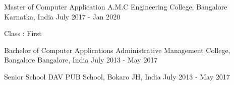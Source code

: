 
\vspace{-2mm}


\begin{cventries}

\cventry
    {Master of Computer Application} %
    {A.M.C Engineering College, Bangalore} %
    {Karnatka, India} %
    {July 2017 - Jan 2020} %
    {
      \begin{cvitems} %
        \item {Class : First}
      \end{cvitems}
    }

    \end{cventries}
\vspace{2mm}
\begin{cventries}

\cventry
    {Bachelor of Computer Applications} %
    {Administrative Management College, Bangalore} %
    {Bangalore, India} %
    {July 2013 - May 2017} %
    { }
    \end{cventries}
\vspace{-1mm}
\begin{cventries}

\cventry
    {Senior School} %
    {DAV PUB School, Bokaro} %
    {JH, India} %
    {July 2013 - May 2017} %
    {} %

    \end{cventries}